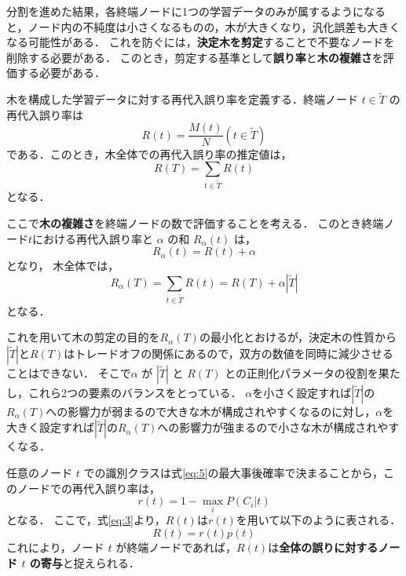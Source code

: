\documentclass[dvipdfmx]{jreport}
\begin{document}
分割を進めた結果，各終端ノードに1つの学習データのみが属するようになると，ノード内の不純度は小さくなるものの，木が大きくなり，汎化誤差も大きくなる可能性がある．
これを防ぐには，\textbf{決定木を剪定}することで不要なノードを削除する必要がある．
このとき，剪定する基準として\textbf{誤り率}と\textbf{木の複雑さ}を評価する必要がある．

木を構成した学習データに対する再代入誤り率を定義する．終端ノード $t \in \tilde{T}$ の再代入誤り率は
\begin{equation}
    R(t) = \frac{M(t)}{N}(t \in \tilde{T}) \label{eq:10}
\end{equation}
である．このとき，木全体での再代入誤り率の推定値は，
\begin{equation}
    R(T) = \sum_{t\in\tilde{T}}R(t) \label{eq:11}
\end{equation}
となる．

ここで\textbf{木の複雑さ}を終端ノードの数で評価することを考える．
このとき終端ノード$t$における再代入誤り率と $\alpha$ の和 $R_\alpha(t)$ は，
\begin{equation}
    R_\alpha(t) = R(t) + \alpha \label{eq:12}
\end{equation}
となり，
木全体では，
\begin{equation}
    R_\alpha(T) = \sum_{t\in\tilde{T}}R(t) = R(T) + \alpha |\tilde{T}| \label{eq:13}
\end{equation}
となる．

これを用いて木の剪定の目的を$R_\alpha(T)$の最小化とおけるが，決定木の性質から$|\tilde{T}|$と$R(T)$はトレードオフの関係にあるので，双方の数値を同時に減少させることはできない．
そこで$\alpha$ が $|\tilde{T}|$ と $R(T)$ との正則化パラメータの役割を果たし，これら2つの要素のバランスをとっている．
$\alpha$を小さく設定すれば$|\tilde{T}|$の$R_\alpha(T)$への影響力が弱まるので大きな木が構成されやすくなるのに対し，$\alpha$を大きく設定すれば$|\tilde{T}|$の$R_\alpha(T)$への影響力が強まるので小さな木が構成されやすくなる．

任意のノード $t$ での識別クラスは式\eqref{eq:5}の最大事後確率で決まることから，このノードでの再代入誤り率は，
\begin{equation}
    r(t) = 1 - \max_{i} P(C_i|t) \label{eq:14}
\end{equation}
となる．
ここで，式\eqref{eq:3}より，$R(t)$は$r(t)$を用いて以下のように表される．
\begin{equation}
    R(t) = r(t) p(t) \label{eq:15}
\end{equation}
これにより，ノード $t$ が終端ノードであれば，$R(t)$は\textbf{全体の誤りに対するノード $t$ の寄与}と捉えられる．
\end{document}
